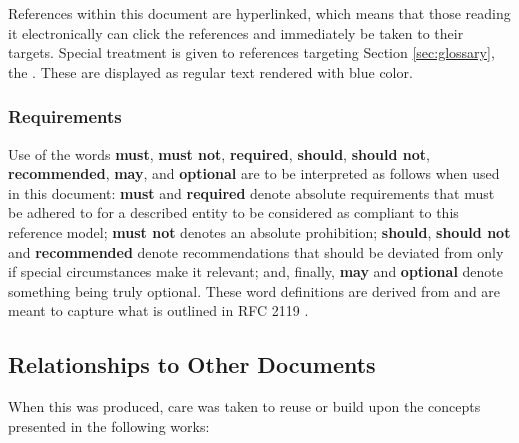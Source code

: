 References within this document are hyperlinked, which means that those reading it electronically can click the references and immediately be taken to their targets.
Special treatment is given to references targeting Section \ref{sec:glossary}, the .
These are displayed as regular text rendered with blue color.

\subsubsection{Requirements}

Use of the words \textbf{must}, \textbf{must not}, \textbf{required}, \textbf{should}, \textbf{should not}, \textbf{recommended}, \textbf{may}, and \textbf{optional} are to be interpreted as follows when used in this document: \textbf{must} and \textbf{required} denote absolute requirements that must be adhered to for a described entity to be considered as compliant to this reference model; \textbf{must not} denotes an absolute prohibition; \textbf{should}, \textbf{should not} and \textbf{recommended} denote recommendations that should be deviated from only if special circumstances make it relevant; and, finally, \textbf{may} and \textbf{optional} denote something being truly optional.
These word definitions are derived from and are meant to capture what is outlined in RFC 2119 \cite{bradner1997keywords}.

\subsection{Relationships to Other Documents}
\label{sec:introduction:relationships}

When this  was produced, care was taken to reuse or build upon the concepts presented in the following works:

